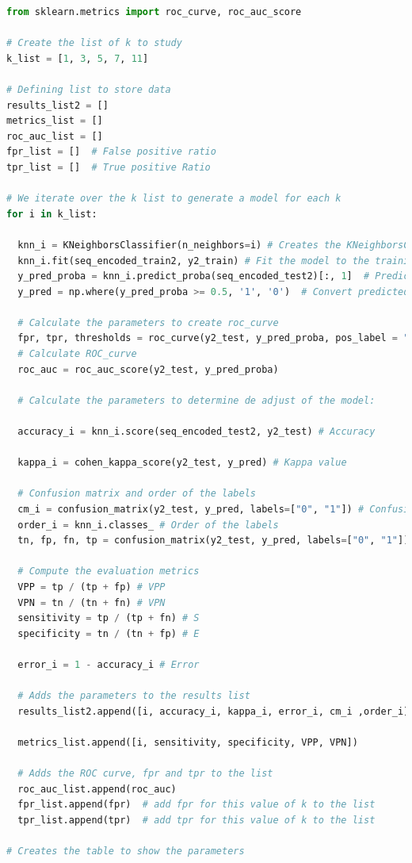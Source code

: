 \documentclass[
]{article}
\begin{document}
\begin{lstlisting}[language=Python]
from sklearn.metrics import roc_curve, roc_auc_score

# Create the list of k to study
k_list = [1, 3, 5, 7, 11]

# Defining list to store data
results_list2 = []
metrics_list = []
roc_auc_list = []
fpr_list = []  # False positive ratio
tpr_list = []  # True positive Ratio

# We iterate over the k list to generate a model for each k
for i in k_list:
  
  knn_i = KNeighborsClassifier(n_neighbors=i) # Creates the KNeighborsClassifier object with k=i
  knn_i.fit(seq_encoded_train2, y2_train) # Fit the model to the training set
  y_pred_proba = knn_i.predict_proba(seq_encoded_test2)[:, 1]  # Predicted probabilities of class 1
  y_pred = np.where(y_pred_proba >= 0.5, '1', '0')  # Convert predicted probabilities to binary class labels
  
  # Calculate the parameters to create roc_curve
  fpr, tpr, thresholds = roc_curve(y2_test, y_pred_proba, pos_label = "1")
  # Calculate ROC_curve
  roc_auc = roc_auc_score(y2_test, y_pred_proba)
  
  # Calculate the parameters to determine de adjust of the model:
  
  accuracy_i = knn_i.score(seq_encoded_test2, y2_test) # Accuracy
  
  kappa_i = cohen_kappa_score(y2_test, y_pred) # Kappa value
  
  # Confusion matrix and order of the labels
  cm_i = confusion_matrix(y2_test, y_pred, labels=["0", "1"]) # Confusion matrix
  order_i = knn_i.classes_ # Order of the labels
  tn, fp, fn, tp = confusion_matrix(y2_test, y_pred, labels=["0", "1"]).ravel() # Extract data 
  
  # Compute the evaluation metrics
  VPP = tp / (tp + fp) # VPP
  VPN = tn / (tn + fn) # VPN
  sensitivity = tp / (tp + fn) # S
  specificity = tn / (tn + fp) # E

  error_i = 1 - accuracy_i # Error
  
  # Adds the parameters to the results list
  results_list2.append([i, accuracy_i, kappa_i, error_i, cm_i ,order_i])
  
  metrics_list.append([i, sensitivity, specificity, VPP, VPN])
  
  # Adds the ROC curve, fpr and tpr to the list
  roc_auc_list.append(roc_auc)
  fpr_list.append(fpr)  # add fpr for this value of k to the list
  tpr_list.append(tpr)  # add tpr for this value of k to the list

# Creates the table to show the parameters
\end{lstlisting}
\end{document}

